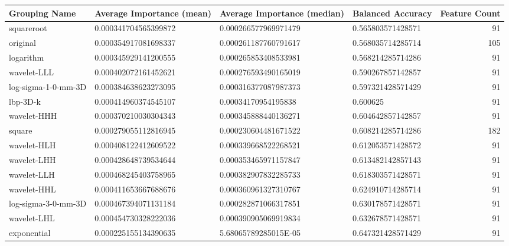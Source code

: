 \begin{table}[H]
  \tiny
  \begin{xltabular}{\textwidth}{X l l l r}
    Grouping Name       & Average Importance (mean) & Average Importance (median) & Balanced Accuracy & Feature Count\\\hline\endhead
    squareroot          & \num{0.000341704565399872} & \num{0.000266577969971479} & \num{0.565803571428571} & 91\\
    original            & \num{0.000354917081698337} & \num{0.000261187760791617} & \num{0.568035714285714} & 105\\
    logarithm           & \num{0.000345929141200555} & \num{0.000265853408533981} & \num{0.568214285714286} & 91\\
    wavelet-LLL         & \num{0.000402072161452621} & \num{0.000276593490165019} & \num{0.590267857142857} & 91\\
    log-sigma-1-0-mm-3D & \num{0.000384638623273095} & \num{0.000316377087987373} & \num{0.597321428571429} & 91\\
    lbp-3D-k            & \num{0.000414960374545107} & \num{0.00034170954195838 } & \num{0.600625}          & 91\\
    wavelet-HHH         & \num{0.000370210030304343} & \num{0.000345888440136271} & \num{0.604642857142857} & 91\\
    square              & \num{0.000279055112816945} & \num{0.000230604481671522} & \num{0.608214285714286} & 182\\
    wavelet-HLH         & \num{0.000408122412609522} & \num{0.000339668522268521} & \num{0.612053571428572} & 91\\
    wavelet-LHH         & \num{0.000428648739534644} & \num{0.000353465971157847} & \num{0.613482142857143} & 91\\
    wavelet-LLH         & \num{0.000468245403758965} & \num{0.000382907832285733} & \num{0.618303571428571} & 91\\
    wavelet-HHL         & \num{0.000411653667688676} & \num{0.000360961327310767} & \num{0.624910714285714} & 91\\
    log-sigma-3-0-mm-3D & \num{0.000467394071131184} & \num{0.000282871066317851} & \num{0.630178571428571} & 91\\
    wavelet-LHL         & \num{0.000454730328222036} & \num{0.000390905069919834} & \num{0.632678571428571} & 91\\
    exponential         & \num{0.000225155134390635} & \num{5.68065789285015E-05} & \num{0.647321428571429} & 91\\

\end{xltabular}
\end{table}
